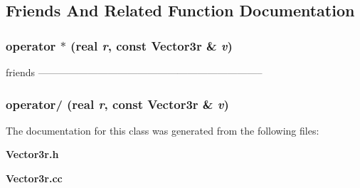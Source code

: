 \subsection{Friends And Related Function Documentation}
\subsubsection{ operator $\ast$ (real {\em r}, const {\bf Vector3r} \& {\em v})\hspace{0.3cm}{\tt  [friend]}}\label{classhxa7241__graphics_1_1Vector3r_4100d997273ac9134374e5e4c24ba005}


friends -------------------------------------------------------------------- 

\subsubsection{ operator/ (real {\em r}, const {\bf Vector3r} \& {\em v})\hspace{0.3cm}{\tt  [friend]}}\label{classhxa7241__graphics_1_1Vector3r_cb81bd446d15afc679ed1d02526a4ec0}




The documentation for this class was generated from the following files:\begin{CompactItemize}
\item 
{\bf Vector3r.h}\item 
{\bf Vector3r.cc}\end{CompactItemize}
